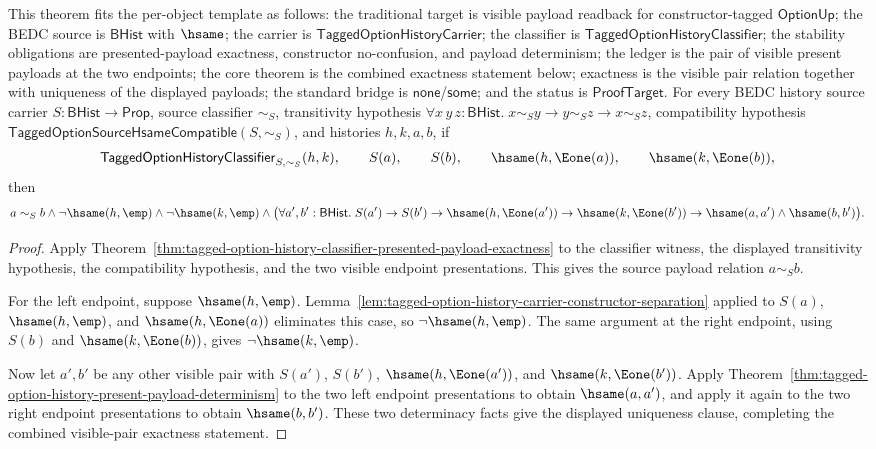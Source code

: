 \begin{theorem}
\label{thm:tagged-option-history-classifier-visible-pair-payload-exactness}
This theorem fits the per-object template as follows: the traditional target is
visible payload readback for constructor-tagged $\mathsf{OptionUp}$; the BEDC
source is $\mathsf{BHist}$ with $\hsame$; the carrier is
$\mathsf{TaggedOptionHistoryCarrier}$; the classifier is
$\mathsf{TaggedOptionHistoryClassifier}$; the stability obligations are
presented-payload exactness, constructor no-confusion, and payload determinism;
the ledger is the pair of visible present payloads at the two endpoints; the
core theorem is the combined exactness statement below; exactness is the visible
pair relation together with uniqueness of the displayed payloads; the standard
bridge is $\mathsf{none}$/$\mathsf{some}$; and the status is
$\mathsf{ProofTarget}$. For every BEDC history source carrier
$S:\mathsf{BHist}\to\mathsf{Prop}$, source classifier $\sim_S$, transitivity
hypothesis
$\forall x\,y\,z:\mathsf{BHist}.\;x\sim_S y\to y\sim_S z\to x\sim_S z$,
compatibility hypothesis $\mathsf{TaggedOptionSourceHsameCompatible}(S,\sim_S)$,
and histories $h,k,a,b$, if
$$
\mathsf{TaggedOptionHistoryClassifier}_{S,\sim_S}(h,k),
\qquad
S(a),\qquad
S(b),\qquad
\hsame(h,\Eone(a)),\qquad
\hsame(k,\Eone(b)),
$$
then
$$
a\sim_S b
\land
\neg\hsame(h,\emp)
\land
\neg\hsame(k,\emp)
\land
\bigl(\forall a',b':\mathsf{BHist}.\;
S(a')\to S(b')\to
\hsame(h,\Eone(a'))\to
\hsame(k,\Eone(b'))\to
\hsame(a,a')\land\hsame(b,b')\bigr).
$$
\end{theorem}
\begin{proof}
Apply Theorem~\ref{thm:tagged-option-history-classifier-presented-payload-exactness}
to the classifier witness, the displayed transitivity hypothesis, the
compatibility hypothesis, and the two visible endpoint presentations. This gives
the source payload relation $a\sim_S b$.

For the left endpoint, suppose $\hsame(h,\emp)$.
Lemma~\ref{lem:tagged-option-history-carrier-constructor-separation} applied to
$S(a)$, $\hsame(h,\emp)$, and $\hsame(h,\Eone(a))$ eliminates this case, so
$\neg\hsame(h,\emp)$. The same argument at the right endpoint, using $S(b)$ and
$\hsame(k,\Eone(b))$, gives $\neg\hsame(k,\emp)$.

Now let $a',b'$ be any other visible pair with $S(a')$, $S(b')$,
$\hsame(h,\Eone(a'))$, and $\hsame(k,\Eone(b'))$. Apply
Theorem~\ref{thm:tagged-option-history-present-payload-determinism} to the two
left endpoint presentations to obtain $\hsame(a,a')$, and apply it again to the
two right endpoint presentations to obtain $\hsame(b,b')$. These two
determinacy facts give the displayed uniqueness clause, completing the combined
visible-pair exactness statement.
\end{proof}

